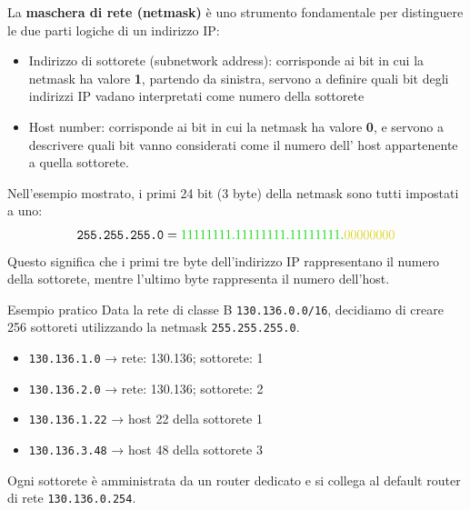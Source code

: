 \documentclass[a4paper,12pt]{report}
\begin{document}
La \textbf{maschera di rete (netmask)} è uno strumento fondamentale per distinguere le due parti logiche di un indirizzo IP:
\begin{itemize}
    \item \textcolor{green!85!black}{Indirizzo di sottorete (subnetwork address):} corrisponde ai bit in cui la netmask ha valore \textbf{1}, partendo da sinistra, servono  a definire quali bit degli indirizzi IP vadano interpretati come numero della sottorete
    \item \textcolor{yellow!85!black}{Host number:} corrisponde ai bit in cui la netmask ha valore \textbf{0}, e servono a descrivere quali bit vanno considerati come il numero dell' host appartenente a quella sottorete.
\end{itemize}

Nell’esempio mostrato, i primi 24 bit (3 byte) della netmask sono tutti impostati a uno:
\[
\texttt{255.255.255.0} = \textcolor{green!85!black}{11111111.11111111.11111111.}\textcolor{yellow!85!black}{00000000}
\]
Questo significa che i primi tre byte dell’indirizzo IP rappresentano il numero della sottorete, mentre l’ultimo byte rappresenta il numero dell’host.

\begin{esempiobox}{Esempio pratico}
Data la rete di classe B \texttt{130.136.0.0/16}, decidiamo di creare 256 sottoreti utilizzando la netmask \texttt{255.255.255.0}.

\begin{itemize}
    \item \texttt{130.136.1.0} → rete: 130.136; sottorete: 1  
    \item \texttt{130.136.2.0} → rete: 130.136; sottorete: 2  
    \item \texttt{130.136.1.22} → host 22 della sottorete 1  
    \item \texttt{130.136.3.48} → host 48 della sottorete 3  
\end{itemize}

Ogni sottorete è amministrata da un router dedicato e si collega al default router di rete \texttt{130.136.0.254}.
\end{esempiobox}
\end{document}
